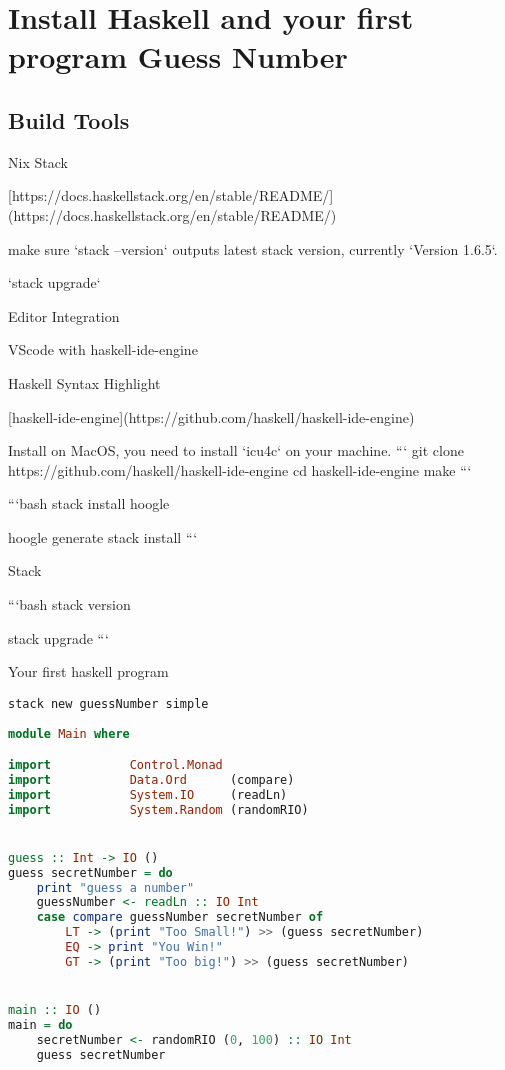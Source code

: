 \chapter{Install Haskell and your first program Guess Number}

 \section{Build Tools}

 Nix
 Stack

[https://docs.haskellstack.org/en/stable/README/](https://docs.haskellstack.org/en/stable/README/)

make sure `stack --version` outputs latest stack version, currently `Version 1.6.5`.

`stack upgrade`

 Editor Integration

 VScode with haskell-ide-engine

Haskell Syntax Highlight

[haskell-ide-engine](https://github.com/haskell/haskell-ide-engine)

Install on MacOS, you need to install `icu4c` on your machine.
```
git clone https://github.com/haskell/haskell-ide-engine
cd haskell-ide-engine
make
```


```bash
stack install hoogle

hoogle generate
stack install
```

 Stack

```bash
stack version

stack upgrade
```

 Your first haskell program

\verb|stack new guessNumber simple|

\begin{lstlisting}[language=haskell]
module Main where

import           Control.Monad
import           Data.Ord      (compare)
import           System.IO     (readLn)
import           System.Random (randomRIO)


guess :: Int -> IO ()
guess secretNumber = do
    print "guess a number"
    guessNumber <- readLn :: IO Int
    case compare guessNumber secretNumber of
        LT -> (print "Too Small!") >> (guess secretNumber)
        EQ -> print "You Win!"
        GT -> (print "Too big!") >> (guess secretNumber)


main :: IO ()
main = do
    secretNumber <- randomRIO (0, 100) :: IO Int
    guess secretNumber
\end{lstlisting}
